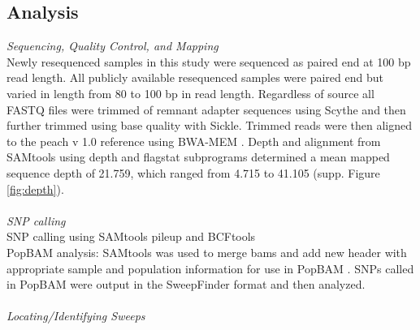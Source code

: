 \documentclass[12pt]{article}
\begin{document}
\subsection*{Analysis}
\emph{Sequencing, Quality Control, and Mapping}\\
Newly resequenced samples in this study were sequenced as paired end at 100 bp read length.
%
All publicly available resequenced samples were paired end but varied in length from 80 to 100 bp in read length. 
%
Regardless of source all FASTQ files were trimmed of remnant adapter sequences using Scythe and then further trimmed using base quality with Sickle. 
%
%
%
Trimmed reads were then aligned to the peach v 1.0 reference using BWA-MEM
 \citep{li2013aligning}. 
%
Depth and alignment from SAMtools using depth and flagstat subprograms \citep{li2009sequence} 
determined a mean mapped sequence depth of 21.759, which ranged from 4.715 to 41.105 (supp. Figure \ref{fig:depth}).\\
%
\\
\emph{SNP calling}\\ %
%
SNP calling using SAMtools pileup and BCFtools \citep{li2009sequence} \\
%
PopBAM analysis: SAMtools was used to merge bams and add new header \citep{li2009sequence} with appropriate sample and population information for use in PopBAM \citep{garrigan2013popbam}. SNPs called in PopBAM were output in the SweepFinder \citep{nielsen2005genomic} format and then analyzed.\\
%
\\
\emph{Locating/Identifying Sweeps}\\
%
\end{document}
